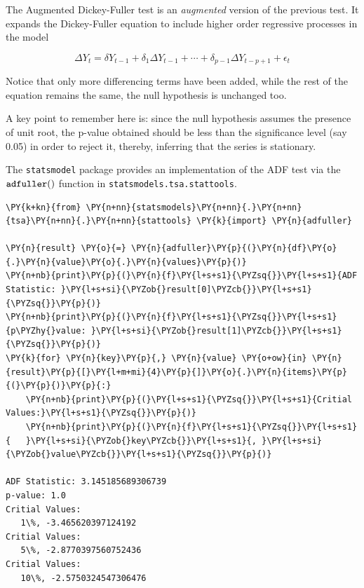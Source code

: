 The Augmented Dickey-Fuller test is an \emph{augmented} version of the
previous test. It expands the Dickey-Fuller equation
to include higher order regressive processes in the model

\[\Delta Y_t = \delta Y_{t-1} + \delta_1 \Delta Y_{t-1} + \cdots + \delta_{p-1} \Delta Y_{t-p+1} + \epsilon_t\]

Notice that only more differencing terms have been added, while the
rest of the equation remains the same, the null hypothesis
is unchanged too.

A key point to remember here is: since the null hypothesis assumes the
presence of unit root, the p-value obtained should be less than the
significance level (say 0.05) in order to reject it,
thereby, inferring that the series is stationary.

The \texttt{statsmodel} package provides an implementation of
the ADF test via the \(\tt{adfuller()}\) function in
\texttt{statsmodels.tsa.stattools}.

\begin{codebox}[breakable, size=fbox, boxrule=1pt, pad at break*=1mm,colback=cellbackground, colframe=cellborder]
\begin{Verbatim}[commandchars=\\\{\}]
\PY{k+kn}{from} \PY{n+nn}{statsmodels}\PY{n+nn}{.}\PY{n+nn}{tsa}\PY{n+nn}{.}\PY{n+nn}{stattools} \PY{k}{import} \PY{n}{adfuller}

\PY{n}{result} \PY{o}{=} \PY{n}{adfuller}\PY{p}{(}\PY{n}{df}\PY{o}{.}\PY{n}{value}\PY{o}{.}\PY{n}{values}\PY{p}{)}
\PY{n+nb}{print}\PY{p}{(}\PY{n}{f}\PY{l+s+s1}{\PYZsq{}}\PY{l+s+s1}{ADF Statistic: }\PY{l+s+si}{\PYZob{}result[0]\PYZcb{}}\PY{l+s+s1}{\PYZsq{}}\PY{p}{)}
\PY{n+nb}{print}\PY{p}{(}\PY{n}{f}\PY{l+s+s1}{\PYZsq{}}\PY{l+s+s1}{p\PYZhy{}value: }\PY{l+s+si}{\PYZob{}result[1]\PYZcb{}}\PY{l+s+s1}{\PYZsq{}}\PY{p}{)}
\PY{k}{for} \PY{n}{key}\PY{p}{,} \PY{n}{value} \PY{o+ow}{in} \PY{n}{result}\PY{p}{[}\PY{l+m+mi}{4}\PY{p}{]}\PY{o}{.}\PY{n}{items}\PY{p}{(}\PY{p}{)}\PY{p}{:}
    \PY{n+nb}{print}\PY{p}{(}\PY{l+s+s1}{\PYZsq{}}\PY{l+s+s1}{Critial Values:}\PY{l+s+s1}{\PYZsq{}}\PY{p}{)}
    \PY{n+nb}{print}\PY{p}{(}\PY{n}{f}\PY{l+s+s1}{\PYZsq{}}\PY{l+s+s1}{   }\PY{l+s+si}{\PYZob{}key\PYZcb{}}\PY{l+s+s1}{, }\PY{l+s+si}{\PYZob{}value\PYZcb{}}\PY{l+s+s1}{\PYZsq{}}\PY{p}{)}

ADF Statistic: 3.145185689306739
p-value: 1.0
Critial Values:
   1\%, -3.465620397124192
Critial Values:
   5\%, -2.8770397560752436
Critial Values:
   10\%, -2.5750324547306476
\end{Verbatim}
\end{codebox}


